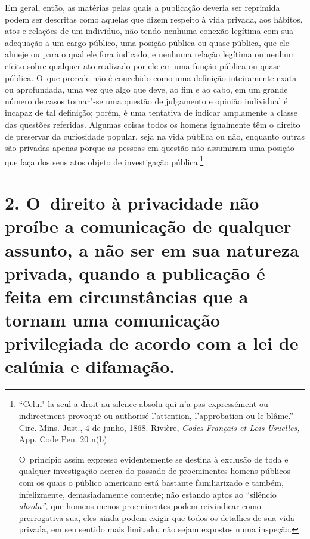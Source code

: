 Em geral, então, as matérias pelas quais a publicação deveria ser
reprimida podem ser descritas como aquelas que dizem respeito à vida
privada, aos hábitos, atos e relações de um indivíduo, não tendo nenhuma
conexão legítima com sua adequação a um cargo público, uma posição
pública ou quase pública, que ele almeje ou para o qual ele fora
indicado, e nenhuma relação legítima ou nenhum efeito sobre qualquer ato
realizado por ele em uma função pública ou quase pública. O~que precede
não é concebido como uma definição inteiramente exata ou aprofundada,
uma vez que algo que deve, ao fim e ao cabo, em um grande número de
casos tornar"-se uma questão de julgamento e opinião individual é incapaz
de tal definição; porém, é uma tentativa de indicar amplamente a classe
das questões referidas. Algumas coisas todos os homens igualmente têm o
direito de preservar da curiosidade popular, seja na vida pública ou
não, enquanto outras são privadas apenas porque as pessoas em questão
não assumiram uma posição que faça dos seus atos objeto de investigação
pública.\footnote{``Celui"-la seul a droit au silence absolu qui n'a pas
  expressément ou indirectment provoqué ou authorisé l'attention,
  l'approbation ou le blâme.'' Circ. Mins. Just., 4 de junho, 1868.
  Rivière, \emph{Codes Français et Lois Usuelles,} App. Code Pen. 20
  n(b).

  O~princípio assim expresso evidentemente se destina à exclusão de toda
  e qualquer investigação acerca do passado de proeminentes homens
  públicos com os quais o público americano está bastante familiarizado
  e também, infelizmente, demasiadamente contente; não estando aptos ao
  ``silêncio \emph{absolu'',} que homens menos proeminentes podem
  reivindicar como prerrogativa sua, eles ainda podem exigir que todos
  os detalhes de sua vida privada, em seu sentido mais limitado, não
  sejam expostos numa inspeção.}

\section{2. O~direito à privacidade não proíbe a comunicação de qualquer
assunto, a não ser em sua natureza privada, quando a publicação é feita
em circunstâncias que a tornam uma comunicação privilegiada de acordo
com a lei de calúnia e difamação.}

